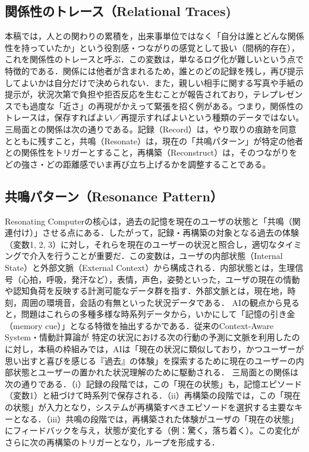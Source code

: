 \documentclass[originalpaper]{jsaiart}
\begin{document}
\subsection{関係性のトレース（Relational Traces) }
本稿では，人との関わりの累積を，出来事単位ではなく「自分は誰とどんな関係性を持っていたか」という役割感・つながりの感覚として扱い（間柄的存在\cite{Watsuji1979}），これを関係性のトレースと呼ぶ．この変数は，単なるログ化が難しいという点で特徴的である．関係には他者が含まれるため，誰とのどの記録を残し，再び提示してよいかは自分だけで決められない．また，親しい相手に関する写真や手紙の提示が，状況次第で負担や拒否反応を生むことが報告されており\cite{gaver2004}，テレプレゼンスでも過度な「近さ」の再現がかえって緊張を招く例がある\cite{ogawa2012}。つまり，関係性のトレースは，保存すればよい／再提示すればよいという種類のデータではない。三局面との関係は次の通りである。記録（Record）は，やり取りの痕跡を同意とともに残すこと，共鳴（Resonate）は，現在の「共鳴パターン」が特定の他者との関係性をトリガーとすること，再構築（Reconstruct）は，そのつながりをどの強さ・どの距離感でいま再び立ち上げるかを調整することである。


\subsection{共鳴パターン（Resonance Pattern）}
Resonating Computerの核心は，過去の記憶を現在のユーザの状態と「共鳴（関連付け）」させる点にある．したがって，記録・再構築の対象となる過去の体験（変数1, 2, 3）に対し，それらを現在のユーザーの状況と照合し，適切なタイミングで介入を行うことが重要だ．この変数は，ユーザの内部状態（Internal State）と外部文脈（External Context）から構成される．内部状態とは，生理信号（心拍，呼吸，発汗など），表情，声色，姿勢といった，ユーザの現在の情動や認知負荷を反映する計測可能なデータ群を指す．外部文脈とは，現在地，時刻，周囲の環境音，会話の有無といった状況データである．
AIの観点から見ると，問題はこれらの多種多様な時系列データから，いかにして「記憶の引き金（memory cue）」となる特徴を抽出するかである．従来のContext-Aware System\cite{Gerhard2012}・情動計算論\cite{picard1997}が 特定の状況における次の行動の予測に文脈を利用したのに対し，本稿の枠組みでは，AIは「現在の状況に類似しており，かつユーザーが思い出すと喜びを感じる『過去』の体験」を探索するために現在のユーザーの内部状態とユーザーの置かれた状況理解のために駆動される．
三局面との関係は次の通りである．（i）記録の段階では，この「現在の状態」も，記憶エピソード（変数1）と紐づけて時系列で保存される．（ii）再構築の段階では，この「現在の状態」が入力となり，システムが再構築すべきエピソードを選択する主要なキーとなる．（iii）共鳴の段階では，再構築された体験がユーザの「現在の状態」にフィードバックを与え，状態が変化する（例：驚く，落ち着く）。この変化がさらに次の再構築のトリガーとなり，ループを形成する．
\end{document}
